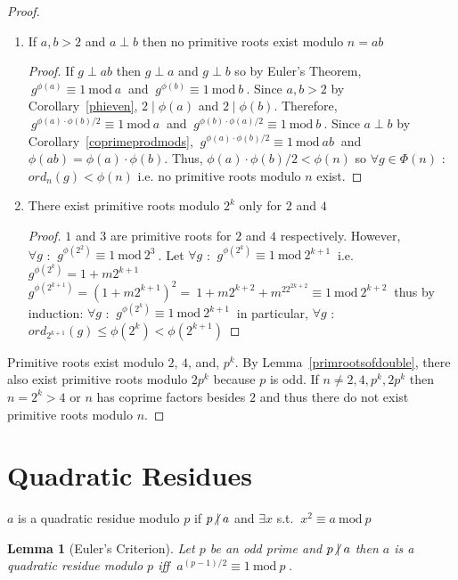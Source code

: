\documentclass[12pt]{extarticle}
\renewcommand\qedsymbol{$\square$}
\newcommand{\divides}{\mid}
\newcommand{\ndivides}{\centernot \mid}
\newtheorem{lemma}[theorem]{Lemma}
\newenvironment{definition}[1][Definition:]{\begin{trivlist}
\item[\hskip \labelsep {\bfseries #1}]}{\end{trivlist}}
\newenvironment{lproof}{\begin{proof} \renewcommand{\qedsymbol}{}}{\end{proof}}
\renewcommand{\mod}[3]{\: #1 \equiv #2 \: \mathrm{mod} \: #3 \:}
\begin{document}
\begin{proof}
\begin{enumerate}
\item If $a,b > 2$ and $a \perp b$ then no primitive roots exist modulo $n = ab$

\begin{lproof}
If $g \perp ab$ then $g \perp a$ and $g \perp b$ so by Euler's Theorem, $\mod{g^{\phi(a)}}{1}{a}$ and $\mod{g^{\phi(b)}}{1}{b}$. Since $a,b > 2$ by Corollary~\ref{phieven}, $2 \divides \phi(a)$ and $2 \divides \phi(b)$. Therefore, $\mod{g^{\phi(a) \cdot \phi(b)/2}}{1}{a}$ and $\mod{g^{\phi(b) \cdot \phi(a) /2}}{1}{b}$. Since $a \perp b$ by Corollary~\ref{coprimeprodmods}, $\mod{g^{\phi(a) \cdot \phi(b) /2}}{1}{ab}$ and $\phi(ab) = \phi(a) \cdot \phi(b)$. Thus, $\phi(a) \cdot \phi(b) /2 < \phi(n)$ so $\forall g \in \Phi(n)$ : $ord_n(g) < \phi(n)$ i.e. no primitive roots modulo $n$ exist.
\end{lproof}

\item There exist primitive roots modulo $2^k$ only for $2$ and $4$

\begin{lproof}
$1$ and $3$ are primitive roots for $2$ and $4$ respectively. However,  \\ $\forall g$ : $\mod{g^{\phi(2^2)}}{1}{2^3}$. Let $\forall g$ : $\mod{g^{\phi(2^k)}}{1}{2^{k+1}}$ i.e. $g^{\phi(2^k)} = 1 + m2^{k+1}$ $g^{\phi(2^{k+1})} = (1+m2^{k+1})^2 = \mod{1 + m2^{k+2} + m^22^{2k+2}}{1}{2^{k+2}}$ thus by induction: $\forall g$ : $\mod{g^{\phi(2^k)}}{1}{2^{k+1}}$ in particular, $\forall g$ : $ord_{2^{k+1}}(g) \le \phi(2^k) < \phi(2^{k+1})$
\end{lproof}
\end{enumerate}
Primitive roots exist modulo $2$, $4$, and, $p^k$. By Lemma~\ref{primrootsofdouble}, there also exist primitive roots modulo $2p^k$ because $p$ is odd. If $n \neq 2,4,p^k,2p^k$ then $n = 2^k > 4$ or $n$ has coprime factors besides $2$  and thus there do not exist primitive roots modulo $n$. 
\end{proof}

\section{Quadratic Residues}

\begin{definition}
$a$ is a quadratic residue modulo $p$ if $p \ndivides a$ and $\exists x$ s.t. $\mod{x^2}{a}{p}$
\end{definition}

\begin{lemma}[Euler's Criterion]
Let $p$ be an odd prime and $p \ndivides a$ then $a$ is a quadratic residue modulo $p$ iff $\mod{a^{(p-1)/2}}{1}{p}$.
\end{lemma}
\end{document}
